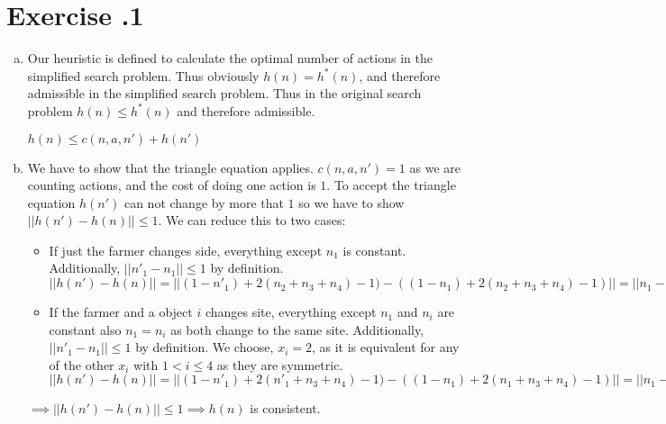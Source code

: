 \documentclass[11pt]{scrartcl}
\newcounter{sheetnr}
\newenvironment{exercise}[2][]{\section*{Exercise \thesheetnr.#2\expandafter\ifstrempty\expandafter{#1}{}{\ (#1)}}}{}
\newenvironment{subexercises}{\begin{enumerate}[a), font=\bfseries, wide, labelindent=0pt]}{\end{enumerate}}
\begin{document}
\begin{exercise}[Heuristics]{1}
\begin{subexercises}
            \begin{itemize}
                \item $(1-n_1) = 1$ when the farmer is on the goal shore and thus has to go back and get another object from the starting shore. $(1-n_1) = 0$ if he is already on the starting shore and thus doesn't have to travel back to the starting shore to get another object.
                \item $2(n_2 + n_3 + n_4) - 1$: for each object he brings from the starting shore he has to travel back except for the last one he brings to the other side.
            \end{itemize}
        
            \item Our heuristic is defined to calculate the optimal number of actions in the simplified search problem. Thus obviously $h(n) = h^*(n)$, and therefore admissible in the simplified search problem. Thus in the original search problem $h(n) \leq h^*(n)$ and therefore admissible.
        
            \begin{center}
                $h(n) \leq c(n,a,n') + h(n')$
            \end{center}
        
            \item We have to show that the triangle equation applies. $c(n,a,n') = 1$ as we are counting actions, and the cost of doing one action is $1$. To accept the triangle equation $h(n')$ can not change by more that $1$ so we have to show $||h(n') - h(n)|| \leq 1$. We can reduce this to two cases:
            \begin{itemize}
                \item If just the farmer changes side, everything except $n_1$ is constant. Additionally, $||{n'}_1 - n_1 || \leq 1$ by definition. \\
                $||h(n') - h(n)|| = ||(1 - {n'}_1) + 2(n_2 + n_3 + n_4) - 1) - ((1 - n_1) + 2(n_2 + n_3 + n_4) - 1)|| = ||n_1 - {n'}_1|| \leq 1$ \\
                \item If the farmer and a object $i$ changes site, 
                everything except $n_1$ and $n_i $ are constant also $n_1 = n_i$ as both change to the same site. Additionally, $||{n'}_1 - n_1 || \leq 1$ by definition. We choose, $x_i = 2$, as it is equivalent for any of the other $x_i$ with $1 < i \leq 4$ as they are symmetric. \\
                $||h(n') - h(n)|| = ||(1 - {n'}_1) + 2({n'}_1 + n_3 + n_4) - 1) - ((1 - n_1) + 2(n_1 + n_3 + n_4) - 1)|| = ||n_1 - {n'}_1 + 2{n'}_1 - 2n_1 || = || n_1 - {n'}_1 || = 1$ \\
            \end{itemize}
        
            $\implies ||h(n') - h(n)|| \leq 1 \implies h(n)$ is consistent.
        
            
        
        
        \end{subexercises}
    \end{exercise}
\end{document}
